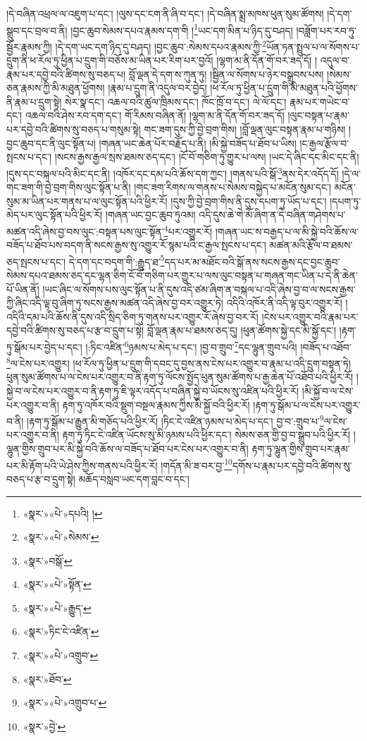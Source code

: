 །དེ་བཞིན་འཕྲལ་ལ་འཇུག་པ་དང་། །ལུས་དང་ངག་ནི་ཞི་བ་དང་། །དེ་བཞིན་སྨྲ་མཁས་ཕུན་སུམ་ཚོགས། །དེ་དག་སྒྲུབ་དང་བྲལ་བ་ནི། །བྱང་ཆུབ་སེམས་དཔའ་རྣམས་དག་གི །\footnote{«སྣར་»«པེ་»དཔའི། །}ཡང་དག་མིན་པ་ཉིད་དུ་བཤད། །བཟློག་པར་རབ་ཏུ་སྦྱོར་རྣམས་ཀྱི། །དེ་དག་ཡང་དག་ཉིད་དུ་བཤད། །བྱང་ཆུབ་:སེམས་དཔའ་རྣམས་ཀྱི་\footnote{«སྣར་»«པེ་»སེམས་}ཡོན་ཏན་སྤྲུལ་པ་ལ་སོགས་པ་དྲུག་ནི་ཕ་རོལ་ཏུ་ཕྱིན་པ་དྲུག་གི་བཅོས་མ་ཡིན་པར་རིག་པར་བྱའོ། །ལྷག་མ་ནི་དོན་གོ་བར་ཟད་དོ། །
འདུལ་བ་རྣམ་པར་དབྱེ་བའི་ཚིགས་སུ་བཅད་པ། བློ་ལྡན་དེ་དག་ས་ཀུན་ཏུ། །སྦྱིན་ལ་སོགས་པ་ཉེར་བསྒྲུབས་པས། །སེམས་ཅན་རྣམས་ཀྱི་མི་མཐུན་ཕྱོགས། །རྣམ་པ་དྲུག་ནི་འདུལ་བར་བྱེད། །ཕ་རོལ་ཏུ་ཕྱིན་པ་དྲུག་གི་མི་མཐུན་པའི་ཕྱོགས་ནི་རྣམ་པ་དྲུག་སྟེ། སེར་སྣ་དང་། འཆལ་བའི་ཚུལ་ཁྲིམས་དང་། ཁོང་ཁྲོ་བ་དང་། ལེ་ལོ་དང་། རྣམ་པར་གཡེང་བ་དང་། འཆལ་བའི་ཤེས་རབ་དག་དང་། གོ་རིམས་བཞིན་ནོ། །ལྷག་མ་ནི་དོན་གོ་བར་ཟད་དོ། །ལུང་བསྟན་པ་རྣམ་པར་དབྱེ་བའི་ཚིགས་སུ་བཅད་པ་གསུམ་སྟེ། གང་ཟག་དུས་ཀྱི་བྱེ་བྲག་གིས། །བློ་ལྡན་ལུང་བསྟན་རྣམ་པ་གཉིས། །བྱང་ཆུབ་དང་ནི་ལུང་སྟོན་པ། །གཞན་ཡང་ཆེན་པོར་བརྗོད་པ་ནི། །མི་སྐྱེ་བཟོད་པ་ཐོབ་པ་ཡིས། །ང་རྒྱལ་རྩོལ་བ་སྤངས་པ་དང་། །སངས་རྒྱས་རྒྱལ་སྲས་ཐམས་ཅད་དང་། །ངོ་བོ་གཅིག་ཏུ་གྱུར་པ་ལས། །ཡང་དེ་ཞིང་དང་མིང་དང་ནི། །དུས་དང་བསྐལ་པའི་མིང་དང་ནི། །འཁོར་དང་དམ་པའི་ཆོས་དག་ཀྱང་། །གནས་པའི་སྒོ་\footnote{«སྣར་»བསྒོ་}ནས་དེར་འདོད་དོ། །དེ་ལ་གང་ཟག་གི་བྱེ་བྲག་གིས་ལུང་སྟོན་པ་ནི། །གང་ཟག་རིགས་ལ་གནས་པ་སེམས་བསྐྱེད་པ་མངོན་སུམ་དང་། མངོན་སུམ་མ་ཡིན་པར་གནས་པ་ལ་ལུང་སྟོན་པའི་ཕྱིར་རོ། །དུས་ཀྱི་བྱེ་བྲག་གིས་ནི་དུས་དཔག་ཏུ་ཡོད་པ་དང་། །དཔག་ཏུ་མེད་པར་ལུང་སྟོན་པའི་ཕྱིར་རོ། །གཞན་ཡང་བྱང་ཆུབ་ཏུའམ། འདི་དུས་ཆེ་གེ་མོ་ཞིག་ན་དེ་བཞིན་གཤེགས་པ་མཚན་འདི་ཞེས་བྱ་བས་ལུང་:བསྟན་པས་ལུང་སྟོན་\footnote{«སྣར་»«པེ་»སྟོན་}པར་འགྱུར་རོ། །གཞན་ཡང་ས་བརྒྱད་པ་ལ་མི་སྐྱེ་བའི་ཆོས་ལ་བཟོད་པ་ཐོབ་པས་བདག་ནི་སངས་རྒྱས་སུ་འགྱུར་རོ་སྙམ་པའི་ང་རྒྱལ་སྤངས་པ་དང་། མཚན་མའི་རྩོལ་བ་ཐམས་ཅད་སྤངས་པ་དང་། དེ་དག་དང་བདག་གི་:རྒྱུད་ཐ་\footnote{«སྣར་»«པེ་»རྒྱུད་}དད་པར་མ་མཐོང་བའི་སྒོ་ནས་སངས་རྒྱས་དང་བྱང་ཆུབ་སེམས་དཔའ་ཐམས་ཅད་དང་ལྷན་ཅིག་ངོ་བོ་གཅིག་པར་གྱུར་པ་ལས་ལུང་བསྟན་པ་གཞན་གང་ཡིན་པ་དེ་ནི་ཆེན་པོ་ཡིན་ནོ། །ཡང་ཞིང་ལ་སོགས་པས་ལུང་སྟོན་པ་ནི་དུས་འདི་ཙམ་ཞིག་ན་བསྐལ་པ་འདི་ཞེས་བྱ་བ་ལ་སངས་རྒྱས་ཀྱི་ཞིང་འདི་ལྟ་བུ་ཞིག་ཏུ་སངས་རྒྱས་མཚན་འདི་ཞེས་བྱ་བར་འགྱུར་ཏེ། འདིའི་འཁོར་ནི་འདི་ལྟ་བུར་འགྱུར་རོ། །འདིའི་དམ་པའི་ཆོས་ནི་དུས་འདི་སྲིད་ཅིག་ཏུ་གནས་པར་འགྱུར་རོ་ཞེས་བྱ་བར་རོ། །ངེས་པར་འགྱུར་བའི་རྣམ་པར་དབྱེ་བའི་ཚིགས་སུ་བཅད་པ་རྩ་བ་དྲུག་པ་སྟེ། བློ་ལྡན་རྣམ་པ་ཐམས་ཅད་དུ། །ཕུན་ཚོགས་སྐྱེ་དང་མི་སྐྱོ་དང་། །རྟག་ཏུ་སྒོམ་པར་བྱེད་པ་དང་། །:ཏིང་འཛིན་\footnote{«སྣར་»ཏིང་ངེ་འཛིན་}ཉམས་པ་མེད་པ་དང་། །བྱ་བ་གྲུབ་\footnote{«སྣར་»«པེ་»འགྲུབ་}དང་ལྷུན་གྲུབ་པའི། །བཟོད་པ་འཐོབ་\footnote{«སྣར་»ཐོབ་}ལ་ངེས་པར་འགྱུར། །ཕ་རོལ་ཏུ་ཕྱིན་པ་དྲུག་གི་དབང་དུ་བྱས་ནས་ངེས་པར་འགྱུར་བ་རྣམ་པ་འདི་དྲུག་བསྟན་ཏེ། ཕུན་སུམ་ཚོགས་པ་ལ་ངེས་པར་འགྱུར་བ་ནི་རྟག་ཏུ་ལོངས་སྤྱོད་ཕུན་སུམ་ཚོགས་པ་རྒྱ་ཆེན་པོ་འཐོབ་པའི་ཕྱིར་རོ། །སྐྱེ་བ་ལ་ངེས་པར་འགྱུར་བ་ནི་རྟག་ཏུ་ཇི་ལྟར་འདོད་པ་བཞིན་སྐྱེ་བ་ཡོངས་སུ་འཛིན་པའི་ཕྱིར་རོ། །མི་སྐྱོ་བ་ལ་ངེས་པར་འགྱུར་བ་ནི། རྟག་ཏུ་འཁོར་བའི་སྡུག་བསྔལ་རྣམས་ཀྱིས་མི་སྐྱོ་བའི་ཕྱིར་རོ། །རྟག་ཏུ་སྒོམ་པ་ལ་ངེས་པར་འགྱུར་བ་ནི། །རྟག་ཏུ་སྒོམ་པ་རྒྱུན་མི་གཅོད་པའི་ཕྱིར་རོ། །ཏིང་ངེ་འཛིན་ཉམས་པ་མེད་པ་དང་། བྱ་བ་:གྲུབ་པ་\footnote{«སྣར་»«པེ་»འགྲུབ་པ་}ལ་ངེས་པར་འགྱུར་བ་ནི། རྟག་ཏུ་ཏིང་ངེ་འཛིན་ཡོངས་སུ་མི་ཉམས་པའི་ཕྱིར་དང་། སེམས་ཅན་གྱི་བྱ་བ་སྒྲུབ་པའི་ཕྱིར་རོ། །ལྷུན་གྱིས་གྲུབ་པར་མི་སྐྱེ་བའི་ཆོས་ལ་བཟོད་པ་ཐོབ་པར་ངེས་པར་འགྱུར་བ་ནི། རྟག་ཏུ་ལྷུན་གྱིས་གྲུབ་པར་རྣམ་པར་མི་རྟོག་པའི་ཡེ་ཤེས་ཀྱིས་གནས་པའི་ཕྱིར་རོ། །གདོན་མི་ཟ་བར་བྱ་\footnote{«སྣར་»བྱེ་}དགོས་པ་རྣམ་པར་དབྱེ་བའི་ཚིགས་སུ་བཅད་པ་རྩ་བ་དྲུག་སྟེ། མཆོད་བསླབ་ཡང་དག་བླང་བ་དང་། 